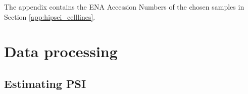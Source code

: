 The appendix contains the ENA Accession Numbers of the chosen samples in Section \ref{app:hipsci_celllines}.


\section{Data processing}\label{sec:dataprocessing}
\subsection{Estimating PSI} \label{subsec:psiestimation}





